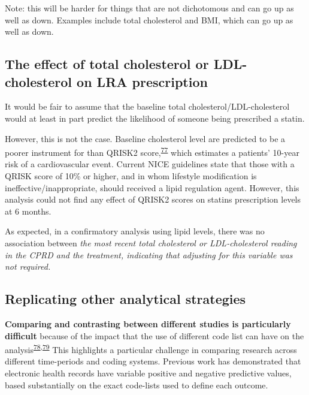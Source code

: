 \documentclass[a4paper, twoside]{templates/ociamthesis}
\begin{document}
Note: this will be harder for things that are not dichotomous and can go up as well as down. Examples include total cholesterol and BMI, which can go up as well as down.

\hypertarget{the-effect-of-total-cholesterol-or-ldl-cholesterol-on-lra-prescription}{%
\subsection{The effect of total cholesterol or LDL-cholesterol on LRA prescription}\label{the-effect-of-total-cholesterol-or-ldl-cholesterol-on-lra-prescription}}

It would be fair to assume that the baseline total cholesterol/LDL-cholesterol would at least in part predict the likelihood of someone being prescribed a statin.

However, this is not the case. Baseline cholesterol level are predicted to be a poorer instrument for than QRISK2 score,\textsuperscript{\protect\hyperlink{ref-hippisley-cox2008}{77}} which estimates a patients' 10-year risk of a cardiovascular event. Current NICE guidelines state that those with a QRISK score of 10\% or higher, and in whom lifestyle modification is ineffective/inappropriate, should received a lipid regulation agent. However, this analysis could not find any effect of QRISK2 scores on statins prescription levels at 6 months.

As expected, in a confirmatory analysis using lipid levels, there was no association between \emph{the most recent total cholesterol or LDL-cholesterol reading in the CPRD and the treatment, indicating that adjusting for this variable was not required.}

\hypertarget{replicating-other-analytical-strategies}{%
\subsection{Replicating other analytical strategies}\label{replicating-other-analytical-strategies}}

\textbf{Comparing and contrasting between different studies is particularly difficult} because of the impact that the use of different code list can have on the analysis\textsuperscript{\protect\hyperlink{ref-wilkinson2018a}{78},\protect\hyperlink{ref-mcguinness2019c}{79}} This highlights a particular challenge in comparing research across different time-periods and coding systems. Previous work has demonstrated that electronic health records have variable positive and negative predictive values, based substantially on the exact code-lists used to define each outcome.
\end{document}
